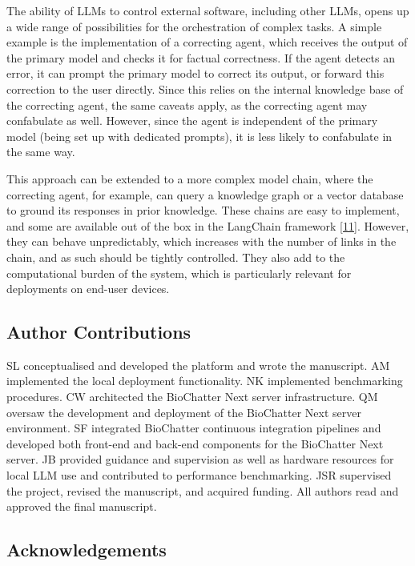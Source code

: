 The ability of LLMs to control external software, including other LLMs, opens up a wide range of possibilities for the orchestration of complex tasks.
A simple example is the implementation of a correcting agent, which receives the output of the primary model and checks it for factual correctness.
If the agent detects an error, it can prompt the primary model to correct its output, or forward this correction to the user directly.
Since this relies on the internal knowledge base of the correcting agent, the same caveats apply, as the correcting agent may confabulate as well.
However, since the agent is independent of the primary model (being set up with dedicated prompts), it is less likely to confabulate in the same way.

This approach can be extended to a more complex model chain, where the correcting agent, for example, can query a knowledge graph or a vector database to ground its responses in prior knowledge.
These chains are easy to implement, and some are available out of the box in the LangChain framework {[}\protect\hyperlink{ref-UEmjXz02}{11}{]}.
However, they can behave unpredictably, which increases with the number of links in the chain, and as such should be tightly controlled.
They also add to the computational burden of the system, which is particularly relevant for deployments on end-user devices.

\hypertarget{author-contributions}{%
\subsection{Author Contributions}\label{author-contributions}}

SL conceptualised and developed the platform and wrote the manuscript.
AM implemented the local deployment functionality.
NK implemented benchmarking procedures.
CW architected the BioChatter Next server infrastructure.
QM oversaw the development and deployment of the BioChatter Next server environment.
SF integrated BioChatter continuous integration pipelines and developed both front-end and back-end components for the BioChatter Next server.
JB provided guidance and supervision as well as hardware resources for local LLM use and contributed to performance benchmarking.
JSR supervised the project, revised the manuscript, and acquired funding.
All authors read and approved the final manuscript.

\hypertarget{acknowledgements}{%
\subsection{Acknowledgements}\label{acknowledgements}}

